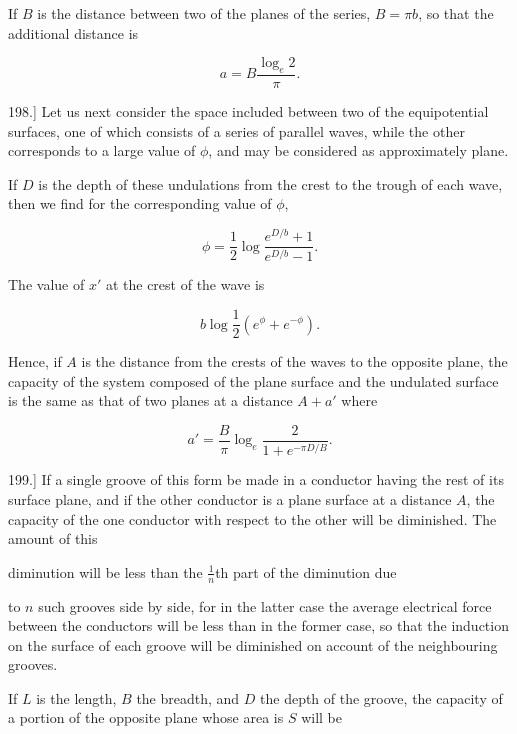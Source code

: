\documentclass[11pt,a4paper]{article}
\begin{document}
If $B$ is the distance between two of the planes of the series,
$B=\pi b$, so that the additional distance is

\begin{equation}\tag{25}
a=B\frac{\log_e 2}{\pi}.
\end{equation}

198.] Let us next consider the space included between two of the
equipotential surfaces, one of which consists of a series of parallel
waves, while the other corresponds to a large value of $\phi$, and may
be considered as approximately plane.

If $D$ is the depth of these undulations from the crest to the trough
of each wave, then we find for the corresponding value of $\phi$,

\begin{equation}\tag{26}
\phi=\frac{1}{2}\log\frac{e^{D/b}+1}{e^{D/b}-1}.
\end{equation}

The value of $x'$ at the crest of the wave is

\begin{equation}\tag{27}
b\log\frac{1}{2}\left(e^\phi+e^{-\phi}\right).
\end{equation}

Hence, if $A$ is the distance from the crests of the waves to the
opposite plane, the capacity of the system composed of the plane
surface and the undulated surface is the same as that of two planes at
a distance $A+a'$ where

\begin{equation}\tag{28}
a'=\frac{B}{\pi}\log_e\frac{2}{1+e^{-\pi D/B}}.
\end{equation}

199.] If a single groove of this form be made in a conductor having
the rest of its surface plane, and if the other conductor is a plane
surface at a distance $A$, the capacity of the one conductor with
respect to the other will be diminished. The amount of this

diminution will be less than the $\frac{1}{n}$th part of the diminution due

to $n$ such grooves side by side, for in the latter case the average
electrical force between the conductors will be less than in the former
case, so that the induction on the surface of each groove will be
diminished on account of the neighbouring grooves.

If $L$ is the length, $B$ the breadth, and $D$ the depth of the groove,
the capacity of a portion of the opposite plane whose area is $S$ will
be
\end{document}
